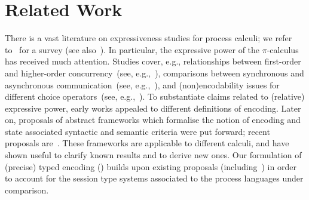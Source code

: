 \section{Related Work}
\label{sec:related}

There is a vast literature on expressiveness studies for process calculi;
we refer to~\cite{DBLP:journals/entcs/Parrow08} for a survey
(see also~\cite[\S\,2.3]{PerezPhD10}). 
In particular, the expressive power of the $\pi$-calculus has received much attention.
Studies cover, e.g., 
relationships between first-order and higher-order concurrency~(see, e.g.,~\cite{SangiorgiD:expmpa,San96int}),
comparisons between 
synchronous and asynchronous communication~(see, e.g.,~\cite{Boudol92,Palamidessi03,BeauxisPV08}),
and
(non)encodability issues for different choice operators~(see, e.g.,~\cite{Nestmann00,DBLP:conf/esop/PetersNG13}).
To substantiate claims related to (relative) expressive power,
early works appealed to different definitions of encoding.
Later on, 
proposals of abstract 
frameworks which formalise the notion of encoding 
and state associated syntactic and semantic criteria 
were put forward; 
recent proposals are~\cite{DBLP:journals/iandc/Gorla10,DBLP:journals/tcs/FuL10,DBLP:journals/corr/abs-1208-2750}. 
These frameworks are applicable to different calculi, and 
have shown useful to clarify known results and to derive new ones.
Our formulation of (precise) typed encoding () 
builds upon existing proposals (including~\cite{Palamidessi03,DBLP:journals/iandc/Gorla10,DBLP:conf/icalp/LanesePSS10})
in order to account for the session type systems
associated to the process languages under comparison.


